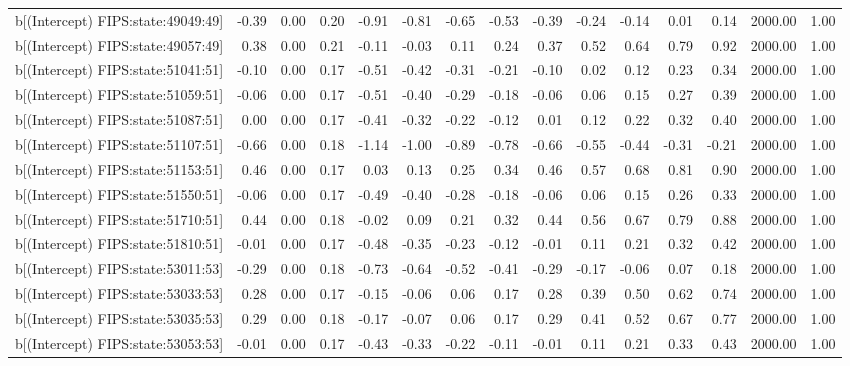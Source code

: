\begin{table}[ht]
\begin{tabular}{rrrrrrrrrrrrrrr}
  b[(Intercept) FIPS:state:49049:49] & -0.39 & 0.00 & 0.20 & -0.91 & -0.81 & -0.65 & -0.53 & -0.39 & -0.24 & -0.14 & 0.01 & 0.14 & 2000.00 & 1.00 \\ 
  b[(Intercept) FIPS:state:49057:49] & 0.38 & 0.00 & 0.21 & -0.11 & -0.03 & 0.11 & 0.24 & 0.37 & 0.52 & 0.64 & 0.79 & 0.92 & 2000.00 & 1.00 \\ 
  b[(Intercept) FIPS:state:51041:51] & -0.10 & 0.00 & 0.17 & -0.51 & -0.42 & -0.31 & -0.21 & -0.10 & 0.02 & 0.12 & 0.23 & 0.34 & 2000.00 & 1.00 \\ 
  b[(Intercept) FIPS:state:51059:51] & -0.06 & 0.00 & 0.17 & -0.51 & -0.40 & -0.29 & -0.18 & -0.06 & 0.06 & 0.15 & 0.27 & 0.39 & 2000.00 & 1.00 \\ 
  b[(Intercept) FIPS:state:51087:51] & 0.00 & 0.00 & 0.17 & -0.41 & -0.32 & -0.22 & -0.12 & 0.01 & 0.12 & 0.22 & 0.32 & 0.40 & 2000.00 & 1.00 \\ 
  b[(Intercept) FIPS:state:51107:51] & -0.66 & 0.00 & 0.18 & -1.14 & -1.00 & -0.89 & -0.78 & -0.66 & -0.55 & -0.44 & -0.31 & -0.21 & 2000.00 & 1.00 \\ 
  b[(Intercept) FIPS:state:51153:51] & 0.46 & 0.00 & 0.17 & 0.03 & 0.13 & 0.25 & 0.34 & 0.46 & 0.57 & 0.68 & 0.81 & 0.90 & 2000.00 & 1.00 \\ 
  b[(Intercept) FIPS:state:51550:51] & -0.06 & 0.00 & 0.17 & -0.49 & -0.40 & -0.28 & -0.18 & -0.06 & 0.06 & 0.15 & 0.26 & 0.33 & 2000.00 & 1.00 \\ 
  b[(Intercept) FIPS:state:51710:51] & 0.44 & 0.00 & 0.18 & -0.02 & 0.09 & 0.21 & 0.32 & 0.44 & 0.56 & 0.67 & 0.79 & 0.88 & 2000.00 & 1.00 \\ 
  b[(Intercept) FIPS:state:51810:51] & -0.01 & 0.00 & 0.17 & -0.48 & -0.35 & -0.23 & -0.12 & -0.01 & 0.11 & 0.21 & 0.32 & 0.42 & 2000.00 & 1.00 \\ 
  b[(Intercept) FIPS:state:53011:53] & -0.29 & 0.00 & 0.18 & -0.73 & -0.64 & -0.52 & -0.41 & -0.29 & -0.17 & -0.06 & 0.07 & 0.18 & 2000.00 & 1.00 \\ 
  b[(Intercept) FIPS:state:53033:53] & 0.28 & 0.00 & 0.17 & -0.15 & -0.06 & 0.06 & 0.17 & 0.28 & 0.39 & 0.50 & 0.62 & 0.74 & 2000.00 & 1.00 \\ 
  b[(Intercept) FIPS:state:53035:53] & 0.29 & 0.00 & 0.18 & -0.17 & -0.07 & 0.06 & 0.17 & 0.29 & 0.41 & 0.52 & 0.67 & 0.77 & 2000.00 & 1.00 \\ 
  b[(Intercept) FIPS:state:53053:53] & -0.01 & 0.00 & 0.17 & -0.43 & -0.33 & -0.22 & -0.11 & -0.01 & 0.11 & 0.21 & 0.33 & 0.43 & 2000.00 & 1.00 \\ 

\end{tabular}
\end{table}
